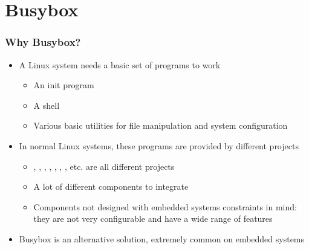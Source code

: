 \section{Busybox}

\begin{frame}
  \frametitle{Why Busybox?}
  \begin{itemize}
  \item A Linux system needs a basic set of programs to work
    \begin{itemize}
    \item An init program
    \item A shell
    \item Various basic utilities for file manipulation and system
      configuration
    \end{itemize}
  \item In normal Linux systems, these programs are provided by
    different projects
    \begin{itemize}
    \item {}, , , ,
      , , , etc. are all different
      projects
    \item A lot of different components to integrate
    \item Components not designed with embedded systems constraints in
      mind: they are not very configurable and have a wide range of
      features
    \end{itemize}
  \item Busybox is an alternative solution, extremely common on
    embedded systems
  \end{itemize}
\end{frame}

